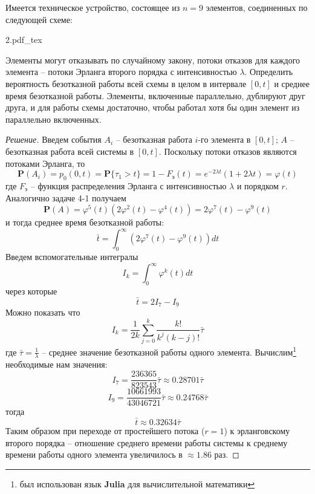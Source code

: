 \documentclass[12pt,a4paper]{article}
\newcommand{\incfig}[1]{%
	\def\svgwidth{\columnwidth}
	{#1.pdf_tex}
}
\newcommand{\pP}{\mathbf{P}}
\begin{document}
\begin{exercise}[Задача 4-2]
	Имеется техническое устройство, состоящее из $n = 9$ элементов, соединенных по следующей схеме:
	
	\incfig{2}
	
	Элементы могут отказывать по случайному закону, потоки отказов для каждого элемента -- потоки Эрланга второго порядка с интенсивностью $\lambda$. Определить вероятность безотказной работы всей схемы в целом в интервале $[0, t]$ и среднее время безотказной работы. Элементы, включенные параллельно, дублируют друг друга, и для работы схемы достаточно, чтобы работал хотя бы один элемент из параллельно включенных.
\end{exercise}
\begin{proof}[Решение]
	Введем события $A_i$ -- безотказная работа $i$-го элемента в $[0, t]$; $A$ -- безотказная работа всей системы в $[0, t]$. Поскольку потоки отказов являются потоками Эрланга, то 
	$$\pP(A_i) = p_0 (0, t) = \pP\{\tau_1 > t\} = 1 - F_\text{э}(t) = e^{-2 \lambda t} (1 + 2\lambda t) = \varphi(t)$$
	где $F_\text{э}$ -- функция распределения Эрланга с интенсивностью $\lambda$ и порядком $r$. Аналогично задаче 4-1 получаем
	$$\pP(A) = \varphi^5 (t) (2 \varphi^2 (t) - \varphi^4 (t)) = 2 \varphi^7 (t) - \varphi^9 (t)$$
	и тогда среднее время безотказной работы:
	$$\bar{t} = \int_{0}^{\infty}{(2\varphi^7 (t) - \varphi^9 (t)) dt}$$
	Введем вспомогательные интегралы
	$$I_k = \int_{0}^{\infty}{\varphi^k(t) dt}$$
	через которые
	$$\bar{t} = 2I_7 - I_9$$
	Можно показать что
	$$I_k = \frac{1}{2k}\sum_{j=0}^{k}{\frac{k!}{k^j (k - j)!}} \bar{\tau}$$
	где $\bar{\tau} = \frac{1}{\lambda}$ -- среднее значение безотказной работы одного элемента. Вычислим\footnote{был использован язык \textbf{Julia} для вычислительной математики} необходимые нам значения:
	$$I_7 = \frac{236365}{823543}\bar{\tau} \approx 0.28701\bar{\tau}$$
	$$I_9 = \frac{10661993}{43046721}\bar{\tau} \approx 0.24768\bar{\tau}$$
	тогда
	$$\bar{t} \approx 0.32634\bar{\tau}$$
	Таким образом при переходе от простейшего потока ($r = 1$) к эрланговскому второго порядка -- отношение среднего времени работы системы к среднему времени работы одного элемента увеличилось в $\approx 1.86$ раз.
\end{proof}
\end{document}
